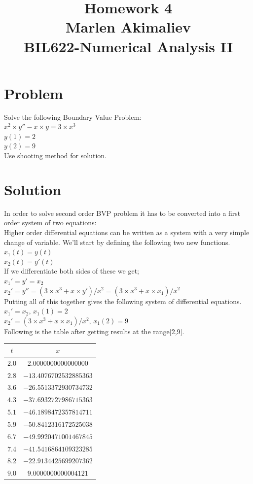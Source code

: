 \documentclass[a4paper,10pt]{article}
\date{\displaydate{date}}
\title{Homework 4\\Marlen Akimaliev\\BIL622-Numerical Analysis II}
\begin{document}
\maketitle

\section{Problem}
Solve the following Boundary Value Problem:\\
$x^2 \times y''-x \times y = 3 \times x^3$\\
$y(1) = 2$\\
$y(2) = 9$\\
Use shooting method for solution.
\section{Solution}
In order to solve second order BVP problem it has to be converted into a first order system of two equations:\\
Higher order differential equations can be written as a system with a very simple change of variable.  We’ll start by defining the following two new functions.\\
$x_1(t) = y(t)$\\
$x_2(t) = y'(t)$\\
If we differentiate both sides of these we get;\\
$x_1'=y'=x_2$\\
$x_2'=y''=(3\times x^3 + x \times y')/x^2=(3\times x^3 + x \times x_1)/x^2$\\
Putting all of this together gives the following system of differential equations.\\
$x_1' = x_2$, $x_1(1)=2$\\
$x_2'=(3\times x^3 + x \times x_1)/x^2$, $x_1(2)=9$\\
Following is the table after getting results at the range[2,9].
\begin{center}
\begin{tabular}{ |c|c| } 
 \hline
 $t$ & $x$\\
\hline
 $2.0$ & $2.0000000000000000$\\
 $2.8$ & $-13.4076702532885363$\\
 $3.6$ & $-26.5513372930734732$\\
 $4.3$ & $-37.6932727986715363$\\
 $5.1$ & $-46.1898472357814711$\\
 $5.9$ & $-50.8412316172525038$\\
 $6.7$ & $-49.9920471001467845$\\
 $7.4$ & $-41.5416864109323285$\\
 $8.2$ & $-22.9134425699207362$\\
 $9.0$ & $9.0000000000004121$\\
 \hline
\end{tabular}
\end{center}
\end{document}
